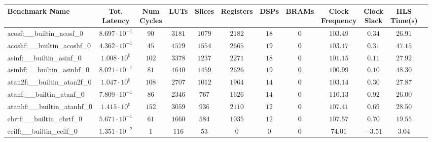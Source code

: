 \begin{tabular}{|l|c|c|c|c|c|c|c|c|c|c|c|}
\hline
Benchmark Name                            & Tot. Latency            & Num Cycles & LUTs      & Slices    & Registers & DSPs    & BRAMs & Clock Frequency & Clock Slack & HLS Time(s) \\
\hline
acosf:\_\_builtin\_acosf\_0               & $ 8.697 \cdot 10^{-1} $ & $ 90     $ & $ 3181  $ & $ 1079  $ & $ 2182  $ & $ 18  $ & $ 0 $ & $ 103.49      $ & $ 0.34    $ & $ 26.91   $ \\
acoshf:\_\_builtin\_acoshf\_0             & $ 4.362 \cdot 10^{-1} $ & $ 45     $ & $ 4579  $ & $ 1554  $ & $ 2665  $ & $ 19  $ & $ 0 $ & $ 103.17      $ & $ 0.31    $ & $ 47.15   $ \\
asinf:\_\_builtin\_asinf\_0               & $ 1.008 \cdot 10^{0}  $ & $ 102    $ & $ 3378  $ & $ 1237  $ & $ 2271  $ & $ 18  $ & $ 0 $ & $ 101.15      $ & $ 0.11    $ & $ 27.92   $ \\
asinhf:\_\_builtin\_asinhf\_0             & $ 8.021 \cdot 10^{-1} $ & $ 81     $ & $ 4640  $ & $ 1459  $ & $ 2626  $ & $ 19  $ & $ 0 $ & $ 100.99      $ & $ 0.10    $ & $ 48.30   $ \\
atan2f:\_\_builtin\_atan2f\_0             & $ 1.047 \cdot 10^{0}  $ & $ 108    $ & $ 2707  $ & $ 1012  $ & $ 1964  $ & $ 14  $ & $ 0 $ & $ 103.14      $ & $ 0.30    $ & $ 27.87   $ \\
atanf:\_\_builtin\_atanf\_0               & $ 7.809 \cdot 10^{-1} $ & $ 86     $ & $ 2346  $ & $ 767   $ & $ 1626  $ & $ 14  $ & $ 0 $ & $ 110.13      $ & $ 0.92    $ & $ 26.00   $ \\
atanhf:\_\_builtin\_atanhf\_0             & $ 1.415 \cdot 10^{0}  $ & $ 152    $ & $ 3059  $ & $ 936   $ & $ 2110  $ & $ 12  $ & $ 0 $ & $ 107.41      $ & $ 0.69    $ & $ 28.50   $ \\
cbrtf:\_\_builtin\_cbrtf\_0               & $ 5.671 \cdot 10^{-1} $ & $ 61     $ & $ 1660  $ & $ 584   $ & $ 1035  $ & $ 12  $ & $ 0 $ & $ 107.57      $ & $ 0.70    $ & $ 19.55   $ \\
ceilf:\_\_builtin\_ceilf\_0               & $ 1.351 \cdot 10^{-2} $ & $ 1      $ & $ 116   $ & $ 53    $ & $ 0     $ & $ 0   $ & $ 0 $ & $ 74.01       $ & $ -3.51   $ & $ 3.04    $ \\

\end{tabular}
